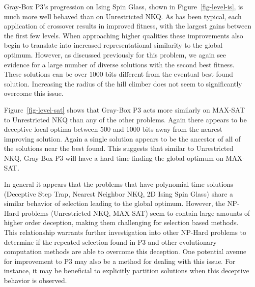 \begin{figure*}
  \centering
  \caption{Distribution of local optima stored at each level of Gray-Box P3 in relation to the best found by the run on an Ising Spin Glass
           $N=6084$.}
  \label{fig-level-is}
\end{figure*}

Gray-Box P3's progression on Ising Spin Glass, shown in Figure~\ref{fig-level-is}, is much more well behaved than on Unrestricted
NKQ. As has been typical, each application of crossover results in improved fitness, with the largest gains between the first few levels.
When approaching higher qualities these improvements also begin to translate into increased representational similarity to the global optimum.
However, as discussed previously for this problem, we again see evidence for a large number of diverse solutions with the second best
fitness. These solutions can be over 1000 bits different from the eventual best found solution. Increasing the radius of the hill climber
does not seem to significantly overcome this issue.

\begin{figure*}
  \centering
  \caption{Distribution of local optima stored at each level of Gray-Box P3 in relation to the best found by the run on
           a MAX-SAT problem $N=6000$.}
  \label{fig-level-sat}
\end{figure*}

Figure~\ref{fig-level-sat} shows that Gray-Box P3 acts more similarly on MAX-SAT to Unrestricted NKQ than any of the other problems. Again there
appears to be deceptive local optima between 500 and 1000 bits away from the nearest improving solution. Again a single solution appears
to be the ancestor of all of the solutions near the best found. This suggests that similar to Unrestricted NKQ, Gray-Box P3 will have a
hard time finding the global optimum on MAX-SAT.

In general it appears that the problems that have polynomial time solutions (Deceptive Step Trap, Nearest Neighbor NKQ, 2D Ising Spin Glass)
share a similar behavior of selection leading to the global optimum. However, the NP-Hard problems (Unrestricted NKQ, MAX-SAT) seem to contain
large amounts of higher order deception, making them challenging for selection based methods. This relationship warrants further investigation
into other NP-Hard problems to determine if the repeated selection found in P3 and other evolutionary computation methods are able to overcome
this deception. One potential avenue for improvement to P3 may also be a method for dealing with this issue. For instance, it may be beneficial to
explicitly partition solutions when this deceptive behavior is observed.

